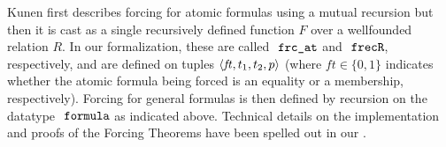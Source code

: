Kunen first describes forcing for atomic formulas using a mutual
recursion
but then \cite[p.~257]{kunen2011set} it is cast as a single
recursively defined function $F$ over a wellfounded  relation $R$.
In our formalization, these are called $\frcat$ and 
$\isatt{frecR}$, respectively, and are defined on tuples $\langle \mathit{ft},t_1,t_2,p\rangle$ (where
$\mathit{ft}\in\{0,1\}$ indicates whether the atomic formula being
forced is an equality or a membership, respectively).
Forcing for general formulas is then defined by recursion on the
datatype $\formula$ as indicated above. Technical details on the
implementation and proofs of the
Forcing Theorems have been spelled out in our
\cite{2020arXiv200109715G}.


